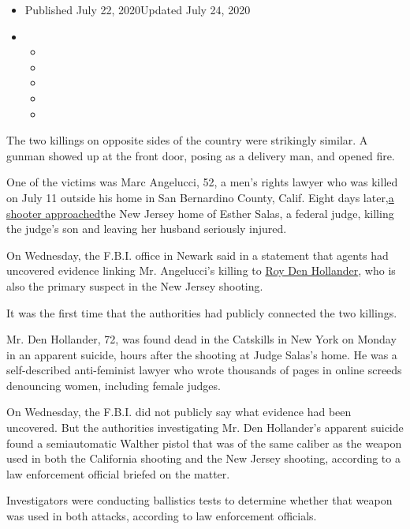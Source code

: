 \begin{itemize}
\item
  Published July 22, 2020Updated July 24, 2020
\item
  \begin{itemize}
  \item
  \item
  \item
  \item
  \item
  \end{itemize}
\end{itemize}

The two killings on opposite sides of the country were strikingly
similar. A gunman showed up at the front door, posing as a delivery man,
and opened fire.

One of the victims was Marc Angelucci, 52, a men's rights lawyer who was
killed on July 11 outside his home in San Bernardino County, Calif.
Eight days
later,\href{https://www.nytimes3xbfgragh.onion/2020/07/20/nyregion/esther-salas.html}{a
shooter approached}the New Jersey home of Esther Salas, a federal judge,
killing the judge's son and leaving her husband seriously injured.

On Wednesday, the F.B.I. office in Newark said in a statement that
agents had uncovered evidence linking Mr. Angelucci's killing to
\href{https://www.nytimes3xbfgragh.onion/2020/07/25/nyregion/roy-den-hollander-esther-salas-list.html}{Roy
Den Hollander}, who is also the primary suspect in the New Jersey
shooting.

It was the first time that the authorities had publicly connected the
two killings.

Mr. Den Hollander, 72, was found dead in the Catskills in New York on
Monday in an apparent suicide, hours after the shooting at Judge Salas's
home. He was a self-described anti-feminist lawyer who wrote thousands
of pages in online screeds denouncing women, including female judges.

On Wednesday, the F.B.I. did not publicly say what evidence had been
uncovered. But the authorities investigating Mr. Den Hollander's
apparent suicide found a semiautomatic Walther pistol that was of the
same caliber as the weapon used in both the California shooting and the
New Jersey shooting, according to a law enforcement official briefed on
the matter.

Investigators were conducting ballistics tests to determine whether that
weapon was used in both attacks, according to law enforcement officials.

